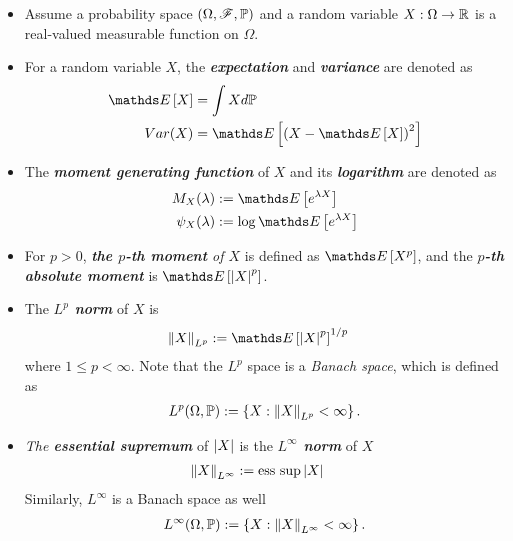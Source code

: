 \documentclass[11pt]{article}
\begin{document}
\begin{itemize}
\item Assume a probability space $(\Omega, {\mathscr F}, {\mathbb P})$ and a random variable $X: \Omega \to {\mathbb R}$ is a real-valued measurable function on $\Omega$.

\item For a random variable $X$, the \emph{\textbf{expectation}} and \emph{\textbf{variance}} are denoted as
\begin{align*}
\E{}{X} &= \int X d\bP \\
Var(X) &= \E{}{\paren{X - \E{}{X}}^2}
\end{align*}

\item The \emph{\textbf{moment generating function}} of $X$ and its \emph{\textbf{logarithm}} are denoted as
\begin{align*}
M_{X}(\lambda) &:= \E{}{e^{\lambda X}} \\
\psi_{X}(\lambda) &:= \log   \E{}{e^{\lambda X}}
\end{align*}

\item For $p > 0$, \emph{\textbf{the $p$-th moment} of $X$} is defined as $\E{}{X^p}$, and the \emph{\textbf{$p$-th absolute moment}} is $\E{}{\abs{X}^p}$.

\item The \emph{\textbf{$L^p$ norm}} of $X$ is
\begin{align*}
\norm{X}{L^p} &:= \E{}{\abs{X}^p}^{1/p}
\end{align*} where $1 \le p  < \infty$. Note that the $L^p$ space is a \emph{Banach space}, which is defined as
\begin{align*}
L^{p}(\Omega, {\mathbb P}) := \left\{X: \left\|X\right\|_{L^p} < \infty \right\}.
\end{align*}

\item \emph{The \textbf{essential supremum}} of $\left\lvert X \right\rvert$ is the \emph{\textbf{$L^\infty$ norm}} of $X$
\begin{align*}
\left\|X\right\|_{L^\infty} &:= \text{ess sup}\left\lvert X \right\rvert
\end{align*} Similarly, $L^{\infty}$ is a Banach space as well
\begin{align*}
L^{\infty}(\Omega, {\mathbb P}) := \left\{X: \left\|X\right\|_{L^\infty} < \infty \right\}.
\end{align*}


\end{itemize}
\end{document}
